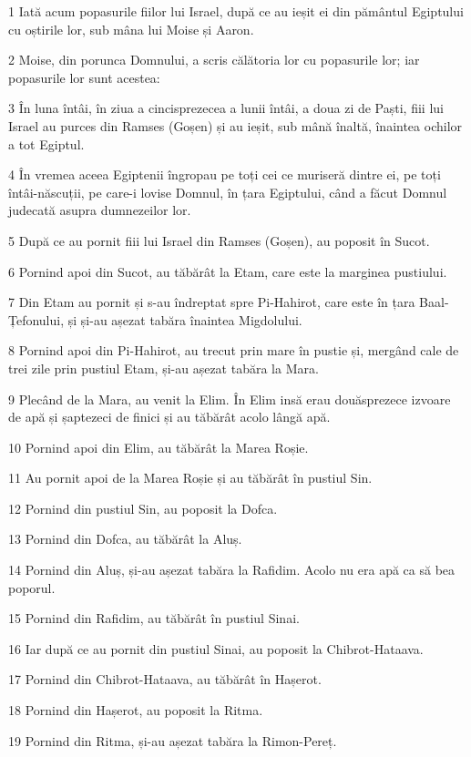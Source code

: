\par 1 Iată acum popasurile fiilor lui Israel, după ce au ieșit ei din pământul Egiptului cu oștirile lor, sub mâna lui Moise și Aaron.
\par 2 Moise, din porunca Domnului, a scris călătoria lor cu popasurile lor; iar popasurile lor sunt acestea:
\par 3 În luna întâi, în ziua a cincisprezecea a lunii întâi, a doua zi de Paști, fiii lui Israel au purces din Ramses (Goșen) și au ieșit, sub mână înaltă, înaintea ochilor a tot Egiptul.
\par 4 În vremea aceea Egiptenii îngropau pe toți cei ce muriseră dintre ei, pe toți întâi-născuții, pe care-i lovise Domnul, în țara Egiptului, când a făcut Domnul judecată asupra dumnezeilor lor.
\par 5 După ce au pornit fiii lui Israel din Ramses (Goșen), au poposit în Sucot.
\par 6 Pornind apoi din Sucot, au tăbărât la Etam, care este la marginea pustiului.
\par 7 Din Etam au pornit și s-au îndreptat spre Pi-Hahirot, care este în țara Baal-Țefonului, și și-au așezat tabăra înaintea Migdolului.
\par 8 Pornind apoi din Pi-Hahirot, au trecut prin mare în pustie și, mergând cale de trei zile prin pustiul Etam, și-au așezat tabăra la Mara.
\par 9 Plecând de la Mara, au venit la Elim. În Elim insă erau douăsprezece izvoare de apă și șaptezeci de finici și au tăbărât acolo lângă apă.
\par 10 Pornind apoi din Elim, au tăbărât la Marea Roșie.
\par 11 Au pornit apoi de la Marea Roșie și au tăbărât în pustiul Sin.
\par 12 Pornind din pustiul Sin, au poposit la Dofca.
\par 13 Pornind din Dofca, au tăbărât la Aluș.
\par 14 Pornind din Aluș, și-au așezat tabăra la Rafidim. Acolo nu era apă ca să bea poporul.
\par 15 Pornind din Rafidim, au tăbărât în pustiul Sinai.
\par 16 Iar după ce au pornit din pustiul Sinai, au poposit la Chibrot-Hataava.
\par 17 Pornind din Chibrot-Hataava, au tăbărât în Hașerot.
\par 18 Pornind din Hașerot, au poposit la Ritma.
\par 19 Pornind din Ritma, și-au așezat tabăra la Rimon-Pereț.
